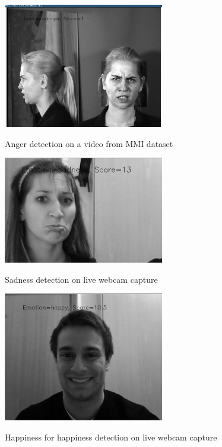 \begin{figure}
\centering
\includegraphics[width=7cm]{images/example_anger.png}
\label{fig:example_anger}
\caption{Anger detection on a video from MMI dataset}
\end{figure}

\begin{figure}
\centering
\includegraphics[width=7cm]{images/example_sad.png}
\label{fig:example_sad}
\caption{Sadness detection on live webcam capture}
\end{figure}

\begin{figure}
\centering
\includegraphics[width=7cm]{images/exampl_happy2.png}
\label{fig:exampl_happy2}
\caption{Happiness for happiness detection on live webcam capture}
\end{figure}

\newpage

